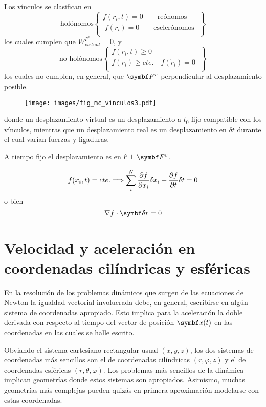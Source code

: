 \documentclass[10pt,oneside]{CBFT_book}
\begin{document}
Los vínculos se clasifican en
\[
\textrm{holónomos} 
\begin{Bmatrix}
 f(r_i,t) = 0 \qquad \textrm{reónomos} \\
\; f(r_i) = 0 \qquad \textrm{esclerónomos} \;\\
\end{Bmatrix} 
\]
los cuales cumplen que  $W_{virtual}^{F^v}=0$, y
\[
\textrm{no holónomos} 
\begin{Bmatrix}
 f(r_i,t) \geq 0  \\
 f(r_i) \geq cte. \quad f(\dot{r}_i) = 0  \; \\
\end{Bmatrix}
\]
los cuales no cumplen, en general, que $\vb{F}^v$ perpendicular al desplazamiento posible.
\begin{figure}[hbt]
	\begin{center}
	\texttt{[image: images/fig\_mc\_vinculos3.pdf]}	
	\end{center}
	\caption{}
\end{figure} 
donde un desplazamiento virtual es un desplazamiento a $t_0$ fijo compatible con los vínculos,
mientras que un desplazamiento real es un desplazamiento en $\delta t$ durante el cual varían
fuerzas y ligaduras.

A tiempo fijo el desplazamiento es en $\hat{r} \perp \vb{F}^v$.

\[
	f(x_i,t) = cte. \Longrightarrow \sum_i^N \frac{\partial^{\hspace{-0.05em}} {f}}{\partial {x_i}^{\hspace{-0.05em}}} \delta x_i + \frac{\partial^{\hspace{-0.05em}} {f}}{\partial {t}^{\hspace{-0.05em}}} \delta t = 0 
\]
o bien
\[
	\nabla f \cdot \vb{\delta r} = 0
\]

\section{Velocidad y aceleración en coordenadas cilíndricas y esféricas}

En la resolución de los problemas dinámicos que surgen de las ecuaciones de Newton la igualdad vectorial involucrada debe,
en general, escribirse en algún sistema de coordenadas apropiado. 
Esto implica para la aceleración la doble derivada con respecto al tiempo del vector de posición $ \vb{x}(t) $ en las
coordenadas en las cuales se halle escrito. 

Obviando el sistema cartesiano rectangular usual $(x,y,z)$, los dos sistemas de coordenadas más sencillos son el de
coordenadas cilíndricas $(r,\varphi,z)$ y el de coordenadas esféricas $(r,\theta,\varphi)$. Los problemas más sencillos
de la dinámica implican geometrías donde estos sistemas son apropiados. Asimismo, muchas geometrías más complejas pueden
quizás en primera aproximación modelarse con estas coordenadas.
\end{document}
